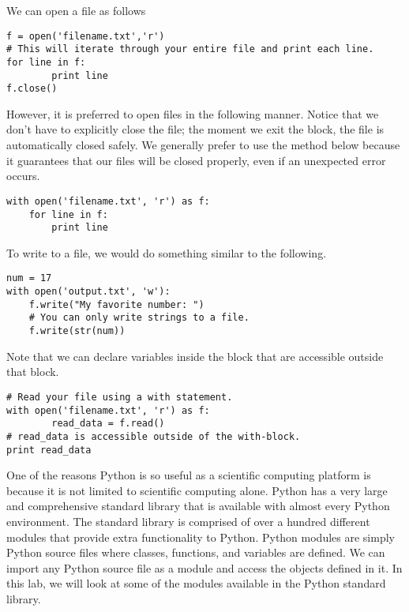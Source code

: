 We can open a file as follows
\begin{lstlisting}
f = open('filename.txt','r')
# This will iterate through your entire file and print each line.
for line in f:
        print line
f.close()
\end{lstlisting}
However, it is preferred to open files in the following manner.
Notice that we don't have to explicitly close the file;
the moment we exit the  block, the file is automatically closed safely.
We generally prefer to use the method below because it guarantees that our files will be closed properly, even if an unexpected error occurs.
\begin{lstlisting}
with open('filename.txt', 'r') as f:
    for line in f:
        print line
\end{lstlisting}

To write to a file, we would do something similar to the following.
\begin{lstlisting}
num = 17
with open('output.txt', 'w'):
    f.write("My favorite number: ")
    # You can only write strings to a file.
    f.write(str(num))
\end{lstlisting}

Note that we can declare variables inside the  block that are accessible outside that block.
\begin{lstlisting}
# Read your file using a with statement.
with open('filename.txt', 'r') as f:
        read_data = f.read()
# read_data is accessible outside of the with-block.
print read_data
\end{lstlisting}

One of the reasons Python is so useful as a scientific computing platform is because it is not limited to scientific computing alone.
Python has a very large and comprehensive standard library that is available with almost every Python environment.
The standard library is comprised of over a hundred different modules that provide extra functionality to Python.
Python modules are simply Python source files where classes, functions, and variables are defined.
We can import any Python source file as a module and access the objects defined in it.
In this lab, we will look at some of the modules available in the Python standard library.

